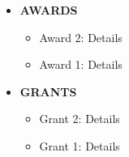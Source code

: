 \noindent\makebox[\linewidth]{\rule{\linewidth}{1.1pt}}
\vspace{-0.5cm}
\begin{itemize}
	\item \textbf{AWARDS} 
	\begin{itemize} %
		\item Award 2: Details
		\item Award 1: Details
	\end{itemize}
	\item \textbf{GRANTS}
	\begin{itemize} %
		\item Grant 2: Details
		\item Grant 1: Details
	\end{itemize}
	
\end{itemize}